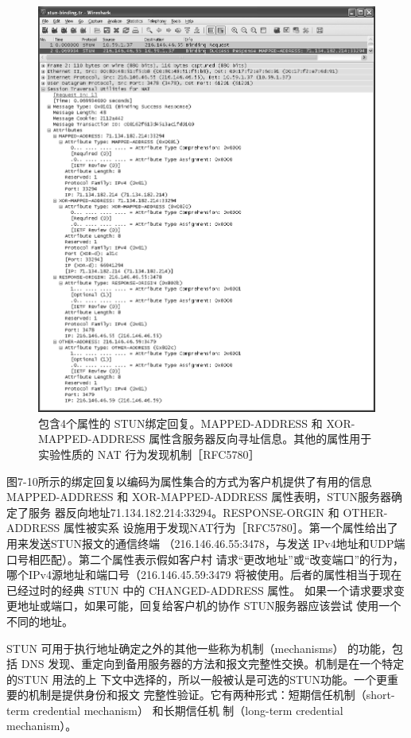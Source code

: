 \begin{figure}[H]
    \centering
	\includegraphics[scale=0.5]{imgs/7/7-10.png}
	\caption{包含4个属性的 STUN绑定回复。MAPPED-ADDRESS 和 XOR-MAPPED-ADDRESS 属性含服务器反向寻址信息。其他的属性用于实验性质的 NAT 行为发现机制［RFC5780］}
\end{figure}

图7-10所示的绑定回复以编码为属性集合的方式为客户机提供了有用的信息
MAPPED-ADDRESS 和 XOR-MAPPED-ADDRESS 属性表明，STUN服务器确定了服务
器反向地址71.134.182.214:33294。RESPONSE-ORGIN 和 OTHER-ADDRESS 属性被实系
设施用于发现NAT行为［RFC5780］。第一个属性给出了用来发送STUN报文的通信终端
（216.146.46.55:3478，与发送 IPv4地址和UDP端口号相匹配）。第二个属性表示假如客户村
请求“更改地址”或“改变端口”的行为，哪个IPv4源地址和端口号（216.146.45.59:3479
将被使用。后者的属性相当于现在已经过时的经典 STUN 中的 CHANGED-ADDRESS 属性。
如果一个请求要求变更地址或端口，如果可能，回复给客户机的协作 STUN服务器应该尝试
使用一个不同的地址。

STUN 可用于执行地址确定之外的其他一些称为机制（mechanisms） 的功能，包括 DNS
发现、重定向到备用服务器的方法和报文完整性交换。机制是在一个特定的STUN 用法的上
下文中选择的，所以一般被认是可选的STUN功能。一个更重要的机制是提供身份和报文
完整性验证。它有两种形式：短期信任机制（short-term credential mechanism） 和长期信任机
制（long-term credential mechanism）。

